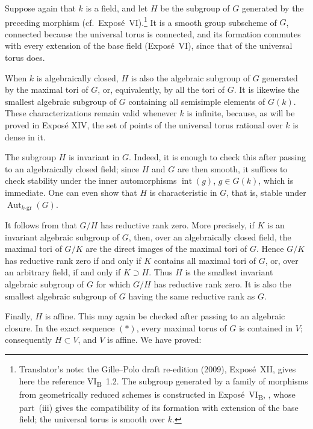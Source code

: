 Suppose again that \(k\) is a field, and let \(H\) be the subgroup
of \(G\) generated by the preceding morphism (cf.\ Exposé~VI).\footnote{Translator's
note: the Gille--Polo draft re-edition (2009), Exposé~XII, gives here the
reference VI\textsubscript{B}~1.2. The subgroup generated by a family of
morphisms from geometrically reduced schemes is constructed in
Exposé~VI\textsubscript{B}, , whose part~(iii) gives the
compatibility of its formation with extension of the base field; the
universal torus is smooth over \(k\).} It is
a smooth group subscheme of \(G\), connected because the universal
torus is connected, and its formation commutes with every extension
of the base field (Exposé~VI), since that of the universal torus does.

When \(k\) is algebraically closed, \(H\) is also the algebraic
subgroup of \(G\) generated by the maximal tori of \(G\), or,
equivalently, by all the tori of \(G\). It is likewise the smallest
algebraic subgroup of \(G\) containing all semisimple elements of
\(G(k)\). These characterizations remain valid whenever \(k\) is
infinite, because, as will be proved in Exposé XIV, the set of
points of the universal torus rational over \(k\) is dense in it.

The subgroup \(H\) is invariant in \(G\). Indeed, it is enough to
check this after passing to an algebraically closed field; since
\(H\) and \(G\) are then smooth, it suffices to check stability
under the inner automorphisms \(\operatorname{int}(g)\),
\(g\in G(k)\), which is immediate. One can even show that \(H\) is
characteristic in \(G\), that is, stable under
\(\operatorname{Aut}_{k\text{-}\mathrm{gr}}(G)\).

It follows from  that \(G/H\) has reductive rank zero. More
precisely, if \(K\) is an invariant algebraic subgroup of \(G\),
then, over an algebraically closed field, the maximal tori of \(G/K\)
are the direct images of the maximal tori of \(G\). Hence \(G/K\)
has reductive rank zero if and only if \(K\) contains all maximal
tori of \(G\), or, over an arbitrary field, if and only if
\(K\supset H\). Thus \(H\) is the smallest invariant algebraic
subgroup of \(G\) for which \(G/H\) has reductive rank zero. It is
also the smallest algebraic subgroup of \(G\) having the same
reductive rank as \(G\).

Finally, \(H\) is affine. This may again be checked after passing to
an algebraic closure. In the exact sequence \((*)\), every maximal
torus of \(G\) is contained in \(V\); consequently \(H\subset V\),
and \(V\) is affine. We have proved:

